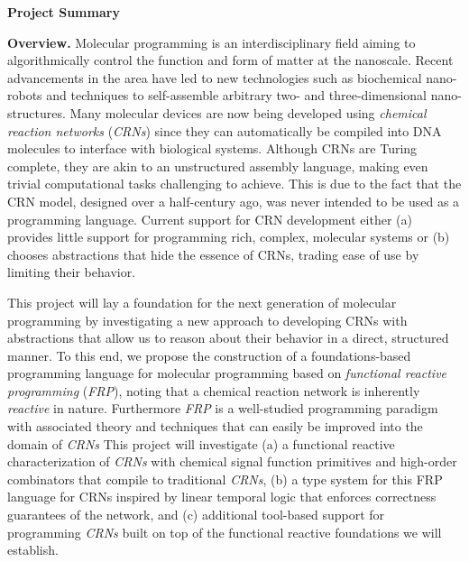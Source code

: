 \documentclass[11pt]{article}
\begin{document}
    \setcounter{page}{1}
    \begin{center}
        {\Large {\bf Project Summary}}
    \end{center}
    \vspace*{1em}

    \textbf{Overview.}
    Molecular programming is an interdisciplinary field aiming to algorithmically control the function and form of matter at the nanoscale.
    Recent advancements in the area have led to new technologies such as biochemical nano-robots and techniques to self-assemble arbitrary two- and three-dimensional nano-structures.
    Many molecular devices are now being developed using \emph{chemical reaction networks} (\emph{CRNs}) since they can automatically be compiled into DNA molecules to interface with biological systems.
    Although CRNs are Turing complete, they are akin to an unstructured assembly language, making even trivial computational tasks challenging to achieve.
    This is due to the fact that the CRN model, designed over a half-century ago, was never intended to be used as a programming language.
    Current support for CRN development either (a) provides little support for programming rich, complex, molecular systems or (b) chooses abstractions that hide the essence of CRNs, trading ease of use by limiting their behavior.

    This project will lay a foundation for the next generation of molecular programming by investigating a new approach to developing CRNs with abstractions that allow us to reason about their behavior in a direct, structured manner.
    To this end, we propose the construction of a foundations-based programming language for molecular programming based on \emph{functional reactive programming} (\emph{FRP}), noting that a chemical reaction network is inherently \emph{reactive} in nature.
    Furthermore \emph{FRP} is a well-studied programming paradigm with associated theory and techniques that can easily be improved into the domain of \emph{CRNs}
    This project will investigate (a) a functional reactive characterization of \emph{CRNs} with chemical signal function primitives and high-order combinators that compile to traditional \emph{CRNs}, (b) a type system for this FRP language for CRNs inspired by linear temporal logic that enforces correctness guarantees of the network, and (c) additional tool-based support for programming \emph{CRNs} built on top of the functional reactive foundations we will establish.
\end{document}
